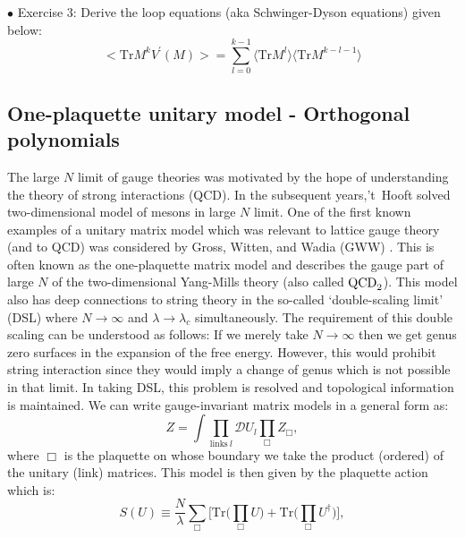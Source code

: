 \documentclass[letter,11pt]{article}
\begin{document}
\begin{mdframed}[backgroundcolor=blue!3] 
	$\bullet$ Exercise 3: Derive the loop equations (aka Schwinger-Dyson equations) given below: \\ 
	\begin{equation}
		\label{eq:LE1} 
		\Big< \mbox{Tr} M^{k} V^{\prime}(M) \Big> = \sum_{l=0}^{k-1} \langle \mbox{Tr} M^{l} \rangle  \langle \mbox{Tr} M^{k-l-1} \rangle
	\end{equation} 
\end{mdframed}

\subsection{One-plaquette unitary model - Orthogonal polynomials} 
The large $N$ limit of gauge theories was motivated by the hope of understanding 
the theory of strong interactions (QCD). 
In the subsequent years,'t~Hooft solved two-dimensional model of mesons in large $N$ limit. One of the first known examples of a unitary matrix model which was relevant to lattice gauge theory (and to QCD) was considered by Gross, Witten, and 
Wadia (GWW) \cite{Gross:1980he, Wadia:2012fr}.
This is often known as the one-plaquette matrix model and describes 
the gauge part of large $N$ of the two-dimensional Yang-Mills theory (also called $\rm{QCD}_{2}$).
This model also has deep connections to string theory in the so-called `double-scaling limit' (DSL) where $N \to \infty$ and $\lambda \to \lambda_{c}$ 
simultaneously. The requirement of this double scaling can be understood as follows: 
If we merely take $N \to \infty$ then we get genus zero surfaces in the 
expansion of the free energy. However, this would prohibit string interaction 
since they would imply a change of genus which is not possible in that limit. 
In taking DSL, this problem is resolved and topological information is maintained. 
We can write gauge-invariant matrix models in a general form as: 
\begin{equation}
	Z = \int \prod_{\text{links} ~ l} \mathcal{D}U_{l} \prod_{\Box} Z_{\Box},
\end{equation}
where $\Box$ is the plaquette on whose boundary we take the product (ordered) of the 
unitary (link) matrices. This model is then given by the plaquette action which is: 
\begin{equation}
	\label{eq:main1} 
	S(U) \equiv \frac{N}{\lambda} \sum_{\Box} \Big[ \mathrm{Tr} 
	\Big( \prod_{\Box} U \Big) + \mathrm{Tr} \Big( \prod_{\Box} U^{\dagger} \Big) \Big], 
\end{equation}
\end{document}
